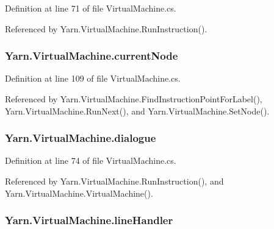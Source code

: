 Definition at line 71 of file Virtual\-Machine.\-cs.



Referenced by Yarn.\-Virtual\-Machine.\-Run\-Instruction().

\hypertarget{a00156_ab7594e14981ad75cecea3b2e7dcf895c}{
\subsubsection[{current\-Node}]{ Yarn.\-Virtual\-Machine.\-current\-Node\hspace{0.3cm}{\ttfamily [private]}}}\label{a00156_ab7594e14981ad75cecea3b2e7dcf895c}


Definition at line 109 of file Virtual\-Machine.\-cs.



Referenced by Yarn.\-Virtual\-Machine.\-Find\-Instruction\-Point\-For\-Label(), Yarn.\-Virtual\-Machine.\-Run\-Next(), and Yarn.\-Virtual\-Machine.\-Set\-Node().

\hypertarget{a00156_ac506426c503da5f033247c29e11c5e82}{
\subsubsection[{dialogue}]{ Yarn.\-Virtual\-Machine.\-dialogue\hspace{0.3cm}{\ttfamily [private]}}}\label{a00156_ac506426c503da5f033247c29e11c5e82}


Definition at line 74 of file Virtual\-Machine.\-cs.



Referenced by Yarn.\-Virtual\-Machine.\-Run\-Instruction(), and Yarn.\-Virtual\-Machine.\-Virtual\-Machine().

\hypertarget{a00156_a29b30454f068fc7e107d48bff4346fd9}{
\subsubsection[{line\-Handler}]{ Yarn.\-Virtual\-Machine.\-line\-Handler}}\label{a00156_a29b30454f068fc7e107d48bff4346fd9}


